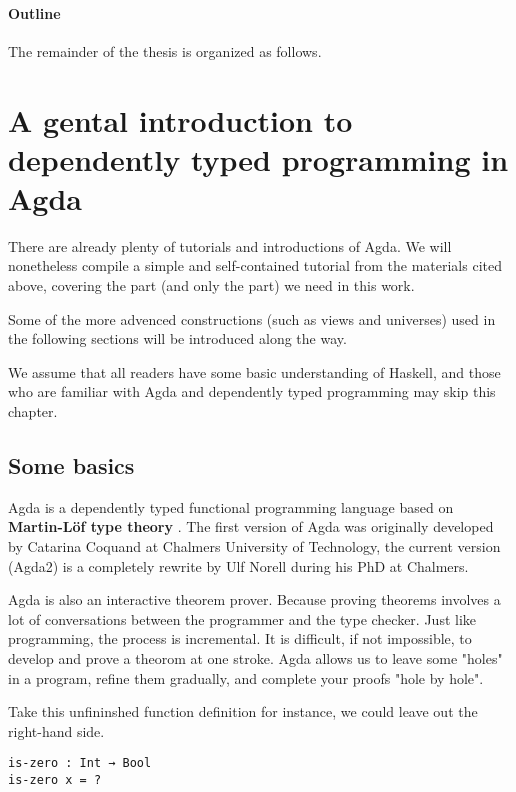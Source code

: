 \documentclass[12pt, a4paper]{article}
\begin{document}
\paragraph{Outline}
The remainder of the thesis is organized as follows.

\section{A gental introduction to dependently typed programming in Agda}\label{agda}

There are already plenty of tutorials and introductions of Agda\cite{norell2009dependently}\cite{FLOLAC16DTP}\cite{brutal}.
We will nonetheless compile a simple and self-contained tutorial from the
materials cited above, covering the part (and only the part) we need in this work.

Some of the more advenced constructions (such as views and universes) used in
the following sections will be introduced along the way.

We assume that all readers have some basic understanding of Haskell, and those
who are familiar with Agda and dependently typed programming may skip this chapter.

\subsection{Some basics}
Agda is a dependently typed functional programming language based on
\textbf{Martin-Löf type theory} \cite{martin1984intuitionistic}.
The first version of Agda was originally developed by Catarina Coquand at Chalmers
University of Technology, the current version (Agda2) is a completely rewrite by
Ulf Norell during his PhD at Chalmers.

Agda is also an interactive theorem prover. Because proving theorems involves a
lot of conversations between the programmer and the type checker. Just like programming,
the process is incremental. It is difficult, if not impossible, to develop and
prove a theorom at one stroke. Agda allows us to leave some "holes" in a
program, refine them gradually, and complete your proofs "hole by hole".

Take this unfininshed function definition for instance, we could leave out the
right-hand side.

\begin{lstlisting}
is-zero : Int → Bool
is-zero x = ?
\end{lstlisting}
\end{document}
